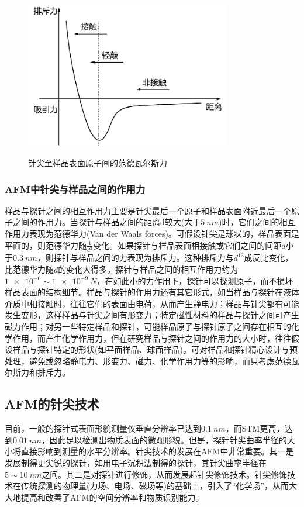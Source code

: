 \documentclass[a4paper]{article}
\begin{document}
\begin{figure}[H]
\centering
\includegraphics[width=0.8\textwidth]{fig/fig5.pdf}\\
\caption{针尖至样品表面原子间的范德瓦尔斯力}\label{fig5}
\end{figure}
\subsubsection{AFM中针尖与样品之间的作用力}
样品与探针之间的相互作用力主要是针尖最后一个原子和样品表面附近最后一个原子之间的作用力。当探针与样品之间的距离d较大(大于$ \SI{5}{nm} $)时，它们之间的相互作用力表现为范德华力(Van der Waals forces)。可假设针尖是球状的，样品表面是平面的，则范德华力随$\frac{1}{d^2}$变化。如果探针与样品表面相接触或它们之间的间距$ d $小于$ \SI{0.3}{nm} $，则探针与样品之间的力表现为排斥力。这种排斥力与$d^{13}$成反比变化，比范德华力随$ d $的变化大得多。探针与样品之间的相互作用力约为$\num{1e-6}\sim\SI{1e-9}{N}$，在如此小的力作用下，探针可以探测原子，而不损坏样品表面的结构细节。样品与探针的作用力还有其它形式，如当样品与探针在液体介质中相接触时，往往它们的表面由电荷，从而产生静电力；样品与针尖都有可能发生变形，这样样品与针尖之间有形变力；特定磁性材料的样品与探针之间可产生磁力作用；对另一些特定样品和探针，可能样品原子与探针原子之间存在相互的化学作用，而产生化学作用力，但在研究样品与探针之间的作用力的大小时，往往假设样品与探针特定的形状(如平面样品、球面样品)，可对样品和探针精心设计与预处理，避免或忽略静电力、形变力、磁力、化学作用力等的影响，而只考虑范德瓦尔斯力和排斥力。
\subsection{AFM的针尖技术}
目前，一般的探针式表面形貌测量仪垂直分辨率已达到$ \SI{0.1}{nm} $，而STM更高，达到$ \SI{0.01}{nm} $，因此足以检测出物质表面的微观形貌。但是，探针针尖曲率半径的大小将直接影响到测量的水平分辨率。针尖技术的发展在AFM中非常重要。其一是发展制得更尖锐的探针，如用电子沉积法制得的探针，其针尖曲率半径在$5\sim\SI{10}{nm}$之间。其二是对探针进行修饰，从而发展起针尖修饰技术。针尖修饰技术在传统探测的物理量(力场、电场、磁场等)的基础上，引入了“化学场”，从而大大地提高和改善了AFM的空间分辨率和物质识别能力。
\end{document}

